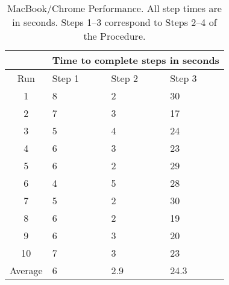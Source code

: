 \begin{table}
  \begin{center}
    \begin{tabularx}{275pt}{| c | X | X | X |}
    \hline
             & \multicolumn{3}{c|}{Time to complete steps in seconds} \\ \hline
    Run      & Step 1 & Step 2 & Step 3 \\ \hline
    1        & 8      & 2      & 30     \\ \hline
    2        & 7      & 3      & 17     \\ \hline
    3        & 5      & 4      & 24     \\ \hline
    4        & 6      & 3      & 23     \\ \hline
    5        & 6      & 2      & 29     \\ \hline
    6        & 4      & 5      & 28     \\ \hline
    7        & 5      & 2      & 30     \\ \hline
    8        & 6      & 2      & 19     \\ \hline
    9        & 6      & 3      & 20     \\ \hline
    10       & 7      & 3      & 23     \\ \hline
    Average  & 6      & 2.9    & 24.3   \\
    \hline
  \end{tabularx}
  \caption{MacBook/Chrome Performance.  All step times are in seconds.  Steps 1--3 correspond to Steps 2--4 of the Procedure.}
  \label{mbChromePerf}
  \end{center}
\end{table}
